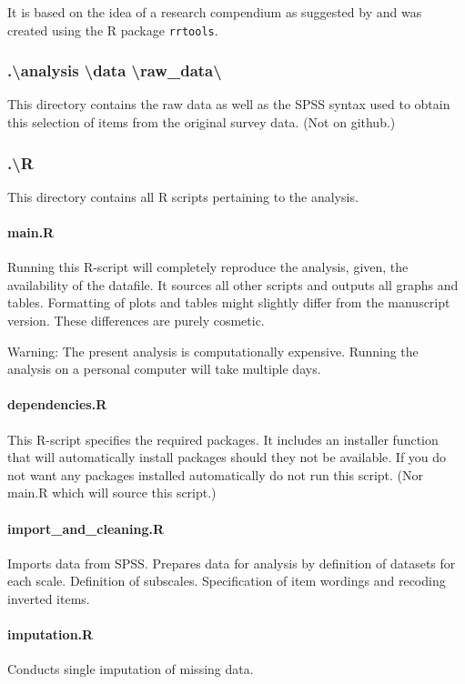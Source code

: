 \documentclass[a4paper,12pt]{article} %
\begin{document}
{It is based on the idea of a research compendium as suggested by \parencite{marwick_packaging_2018} and was created using the R package \texttt{rrtools}.

\subsubsection{.\textbackslash analysis \textbackslash data \textbackslash raw\_data\textbackslash}
This directory contains the raw data as well as the SPSS syntax used to obtain this selection of items from the original survey data.
(Not on github.)

\subsubsection{.\textbackslash R}
This directory contains all R scripts pertaining to the analysis.

\paragraph{main.R}
Running this R-script will completely reproduce the analysis, given, the availability of the datafile.
It sources all other scripts and outputs all graphs and tables.
Formatting of plots and tables might slightly differ from the manuscript version.
These differences are purely cosmetic.

Warning: The present analysis is computationally expensive.
Running the analysis on a personal computer will take multiple days.

\paragraph{dependencies.R}
This R-script specifies the required packages.
It includes an installer function that will automatically install packages should they not be available.
If you do not want any packages installed automatically do not run this script. (Nor main.R which will source this script.)

\paragraph{import\_and\_cleaning.R}
Imports data from SPSS. Prepares data for analysis by definition of datasets for each scale. Definition of subscales.
Specification of item wordings and recoding inverted items.

\paragraph{imputation.R}
Conducts single imputation of missing data.

}
\end{document}
